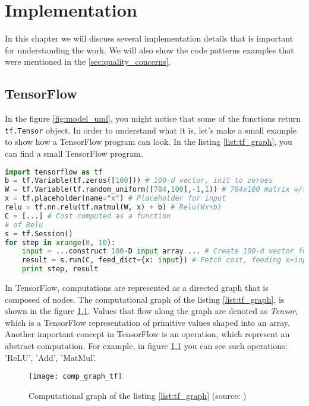 \chapter{Implementation}
\label{ch:implementation}
In this chapter we will discuss several implementation details that
is important for understanding the work. We will also show
the code patterns examples that were mentioned in the \autoref{sec:quality_concerns}.

\section{TensorFlow}
In the figure \ref{fig:model_uml}, you might notice that some of the functions
return \lstinline{tf.Tensor} object. In order to understand what it is,
let's make a small example to show how a TensorFlow program can look.
In the listing \ref{list:tf_graph}, you can find a small TensorFlow program.



\begin{lstlisting}[language=Python, caption={TensorFlow example (source: \cite{tensorflow2015-whitepaper)}},label={list:tf_graph}]
import tensorflow as tf
b = tf.Variable(tf.zeros([100])) # 100-d vector, init to zeroes
W = tf.Variable(tf.random_uniform([784,100],-1,1)) # 784x100 matrix w/rnd vals
x = tf.placeholder(name="x") # Placeholder for input
relu = tf.nn.relu(tf.matmul(W, x) + b) # Relu(Wx+b)
C = [...] # Cost computed as a function
# of Relu
s = tf.Session()
for step in xrange(0, 10):
	input = ...construct 100-D input array ... # Create 100-d vector for input
	result = s.run(C, feed_dict={x: input}) # Fetch cost, feeding x=input
	print step, result
\end{lstlisting}


In TensorFlow, computations are represented as a directed graph that is composed
of nodes. The computational graph of the listing \ref{list:tf_graph}, is shown
in the figure \ref{fig:comp_graph_tf}. Values that flow along the graph are denoted
as \emph{Tensor}, which is a TensorFlow representation of primitive values shaped
into an array. Another important concept in TensorFlow is an operation, which represent
an abstract computation. For example, in figure \ref{fig:comp_graph_tf} you can see
such operations: 'ReLU', 'Add', 'MatMul'.


\begin{figure}[H]
	\texttt{[image: comp\_graph\_tf]}
	\caption{Computational graph of the listing \ref{list:tf_graph} (source: \cite{tensorflow2015-whitepaper})}
	\label{fig:comp_graph_tf}
\end{figure}


